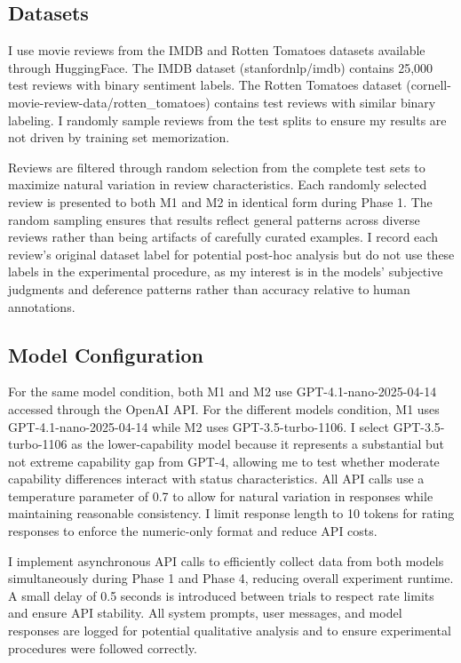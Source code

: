 \subsection{Datasets}

I use movie reviews from the IMDB and Rotten Tomatoes datasets available through HuggingFace. The IMDB dataset (stanfordnlp/imdb) contains 25,000 test reviews with binary sentiment labels. The Rotten Tomatoes dataset (cornell-movie-review-data/rotten\_tomatoes) contains test reviews with similar binary labeling. I randomly sample reviews from the test splits to ensure my results are not driven by training set memorization.

Reviews are filtered through random selection from the complete test sets to maximize natural variation in review characteristics. Each randomly selected review is presented to both M1 and M2 in identical form during Phase 1. The random sampling ensures that results reflect general patterns across diverse reviews rather than being artifacts of carefully curated examples. I record each review's original dataset label for potential post-hoc analysis but do not use these labels in the experimental procedure, as my interest is in the models' subjective judgments and deference patterns rather than accuracy relative to human annotations.

\subsection{Model Configuration}

For the same model condition, both M1 and M2 use GPT-4.1-nano-2025-04-14 accessed through the OpenAI API. For the different models condition, M1 uses GPT-4.1-nano-2025-04-14 while M2 uses GPT-3.5-turbo-1106. I select GPT-3.5-turbo-1106 as the lower-capability model because it represents a substantial but not extreme capability gap from GPT-4, allowing me to test whether moderate capability differences interact with status characteristics. All API calls use a temperature parameter of 0.7 to allow for natural variation in responses while maintaining reasonable consistency. I limit response length to 10 tokens for rating responses to enforce the numeric-only format and reduce API costs.

I implement asynchronous API calls to efficiently collect data from both models simultaneously during Phase 1 and Phase 4, reducing overall experiment runtime. A small delay of 0.5 seconds is introduced between trials to respect rate limits and ensure API stability. All system prompts, user messages, and model responses are logged for potential qualitative analysis and to ensure experimental procedures were followed correctly.

